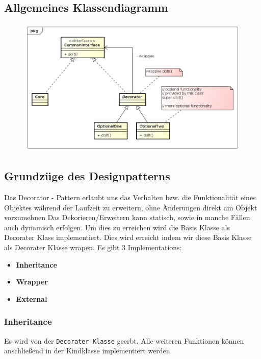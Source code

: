 	\subsection{Allgemeines Klassendiagramm}
	\begin{figure}[!h]
		\begin{center}
			\includegraphics[width=0.9\linewidth]{images/dec.png}
		\end{center}
	\end{figure}
	
	\subsection{Grundzüge des Designpatterns}
	Das Decorator - Pattern erlaubt uns das Verhalten bzw. die Funktionalität eines Objektes während der
	Laufzeit zu erweitern, ohne Änderungen direkt am Objekt vorzumehnen
	Das Dekorieren/Erweitern kann statisch, sowie in manche Fällen auch dynamisch erfolgen. Um dies zu
	erreichen wird die Basis Klasse als Decorater Klass implementiert. Dies wird erreicht indem wir diese
	Basis Klasse als Decorater Klasse wrapen. Es gibt 3 Implementations:
	
	\begin{itemize}
		\item \textbf{Inheritance}
		\item \textbf{Wrapper}
		\item \textbf{External}
	\end{itemize}
	

\clearpage

	
	\subsubsection{Inheritance \cite{decoratorDebug}}
	Es wird von der \texttt{Decorater Klasse} geerbt. Alle weiteren Funktionen können anschließend in der Kindklasse implementiert werden.
	
